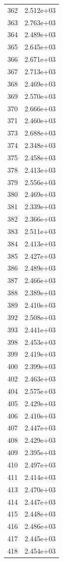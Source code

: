 \documentclass[12pt]{article}
\begin{document}
\begin{longtable}{@{}cc@{}}
362 & 2.512e+03 \\
363 & 2.763e+03 \\
364 & 2.489e+03 \\
365 & 2.645e+03 \\
366 & 2.671e+03 \\
367 & 2.713e+03 \\
368 & 2.469e+03 \\
369 & 2.570e+03 \\
370 & 2.666e+03 \\
371 & 2.460e+03 \\
373 & 2.688e+03 \\
374 & 2.348e+03 \\
375 & 2.458e+03 \\
378 & 2.413e+03 \\
379 & 2.556e+03 \\
380 & 2.469e+03 \\
381 & 2.339e+03 \\
382 & 2.366e+03 \\
383 & 2.511e+03 \\
384 & 2.413e+03 \\
385 & 2.427e+03 \\
386 & 2.489e+03 \\
387 & 2.466e+03 \\
388 & 2.389e+03 \\
389 & 2.410e+03 \\
392 & 2.508e+03 \\
393 & 2.441e+03 \\
398 & 2.453e+03 \\
399 & 2.419e+03 \\
400 & 2.399e+03 \\
402 & 2.463e+03 \\
404 & 2.575e+03 \\
405 & 2.429e+03 \\
406 & 2.410e+03 \\
407 & 2.447e+03 \\
408 & 2.429e+03 \\
409 & 2.395e+03 \\
410 & 2.497e+03 \\
411 & 2.414e+03 \\
413 & 2.470e+03 \\
414 & 2.447e+03 \\
415 & 2.448e+03 \\
416 & 2.486e+03 \\
417 & 2.445e+03 \\
418 & 2.454e+03 \\

\end{longtable}
\end{document}
